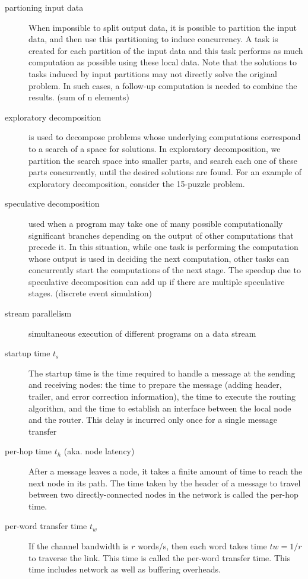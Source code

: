 \begin{description}
\item[partioning input data] When impossible to split output data, it is possible to partition the input data, and then use this partitioning to induce concurrency. A task is created for each partition of the input data and this task performs as much computation as possible using these local data. Note that the solutions to tasks induced by input partitions may not directly solve the original problem. In such cases, a follow-up computation is needed to combine the results. (sum of n elements)

\item[exploratory decomposition] is used to decompose problems whose underlying computations correspond to a search of a space for solutions. In exploratory decomposition, we partition the search space into smaller parts, and search each one of these parts concurrently, until the desired solutions are found. For an example of exploratory decomposition, consider the 15-puzzle problem.


\item[speculative decomposition] used when a program may take one of many possible computationally significant branches depending on the output of other computations that precede it. In this situation, while one task is performing the computation whose output is used in deciding the next computation, other tasks can concurrently start the computations of the next stage. The speedup due to speculative decomposition can add up if there are multiple speculative stages. (discrete event simulation)


\item[stream parallelism] simultaneous execution of different programs on a data stream


\item[startup time $t_s$] The startup time is the time required to handle a message at the sending and receiving nodes: the time to prepare the message (adding header, trailer, and error correction information), the time to execute the routing algorithm, and the time to establish an interface between the local node and the router. This delay is incurred only once for a single message transfer

\item[per-hop time $t_h$ (aka. node latency)] After a message leaves a node, it takes a finite amount of time to reach the next node in its path. The time taken by the header of a message to travel between two directly-connected nodes in the network is called the per-hop time.


\item[per-word transfer time $t_w$] If the channel bandwidth is $r$ words/s, then each word takes time $tw = 1/r$ to traverse the link. This time is called the per-word transfer time. This time includes network as well as buffering overheads.




\end{description}
